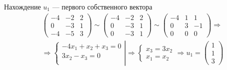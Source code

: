 \documentclass[12pt]{article}
\begin{document}
\begin{sloppypar}
    Нахождение $u_1$ — первого собственного вектора
    \begin{align*}
         & \begin{pmatrix}
               -4 & -2 & 2 \\
               0  & -3 & 1 \\
               -4 & -5 & 3
           \end{pmatrix}
        \sim
        \begin{pmatrix}
            -4 & -2 & 2 \\
            0  & -3 & 1 \\
            0  & -3 & 1
        \end{pmatrix}
        \sim
        \begin{pmatrix}
            -4 & 1 & 1  \\
            0  & 3 & -1 \\
            0  & 0 & 0
        \end{pmatrix}
        \Rightarrow       \\
         & \Rightarrow
        \left.\begin{cases}
                  -4x_1 + x_2 + x_3 = 0 \\
                  3x_2 - x_3 = 0        \\
              \end{cases}\right|
        \Rightarrow
        \begin{cases}
            x_3 = 3x_2 \\
            x_1 = x_2
        \end{cases}
        \Rightarrow
        u_1 = \begin{pmatrix}
                  1 \\ 1 \\ 3
              \end{pmatrix}
    \end{align*}


\end{sloppypar}
\end{document}
